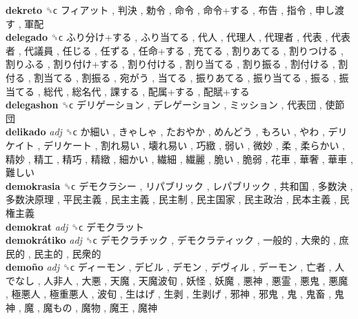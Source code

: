 \textbf{dekreto} ␝ϲ   フィアット ,  判決 ,  勅令 ,  命令 ,  命令+する ,  布告 ,  指令 ,  申し渡す ,  軍配   \\
\textbf{delegado} ␝ϲ   ふり分け+する ,  ふり当てる ,  代人 ,  代理人 ,  代理者 ,  代表 ,  代表者 ,  代議員 ,  任じる ,  任ずる ,  任命+する ,  充てる ,  割りあてる ,  割りつける ,  割りふる ,  割り付け+する ,  割り付ける ,  割り当てる ,  割り振る ,  割付ける ,  割付る ,  割当てる ,  割振る ,  宛がう ,  当てる ,  振りあてる ,  振り当てる ,  振る ,  振当てる ,  総代 ,  総名代 ,  課する ,  配属+する ,  配賦+する   \\
\textbf{delegashon} ␝ϲ   デリゲーション ,  デレゲーション ,  ミッション ,  代表団 ,  使節団   \\
\textbf{delikado} \emph{adj}  ␝ϲ   か細い ,  きゃしゃ ,  たおやか ,  めんどう ,  もろい ,  やわ ,  デリケイト ,  デリケート ,  割れ易い ,  壊れ易い ,  巧緻 ,  弱い ,  微妙 ,  柔 ,  柔らかい ,  精妙 ,  精工 ,  精巧 ,  精緻 ,  細かい ,  繊細 ,  繊麗 ,  脆い ,  脆弱 ,  花車 ,  華奢 ,  華車 ,  難しい   \\
\textbf{demokrasia} ␝ϲ   デモクラシー ,  リパブリック ,  レパブリック ,  共和国 ,  多数決 ,  多数決原理 ,  平民主義 ,  民主主義 ,  民主制 ,  民主国家 ,  民主政治 ,  民本主義 ,  民権主義   \\
\textbf{demokrat} \emph{adj}  ␝ϲ   デモクラット   \\
\textbf{demokrátiko} \emph{adj}  ␝ϲ   デモクラチック ,  デモクラティック ,  一般的 ,  大衆的 ,  庶民的 ,  民主的 ,  民衆的   \\
\textbf{demoño} \emph{adj}  ␝ϲ   ディーモン ,  デビル ,  デモン ,  デヴィル ,  デーモン ,  亡者 ,  人でなし ,  人非人 ,  大悪 ,  天魔 ,  天魔波旬 ,  妖怪 ,  妖魔 ,  悪神 ,  悪霊 ,  悪鬼 ,  悪魔 ,  極悪人 ,  極重悪人 ,  波旬 ,  生はげ ,  生剥 ,  生剥げ ,  邪神 ,  邪鬼 ,  鬼 ,  鬼畜 ,  鬼神 ,  魔 ,  魔もの ,  魔物 ,  魔王 ,  魔神   \\
